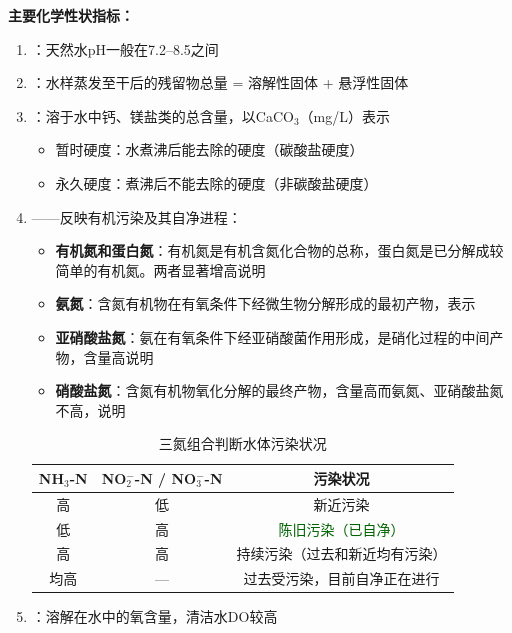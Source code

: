 \begin{keybox}
\textbf{主要化学性状指标：}

\begin{enumerate}[leftmargin=*]
    \item {}：天然水pH一般在7.2--8.5之间
    \item {}：水样蒸发至干后的残留物总量 = 溶解性固体 + 悬浮性固体
    \item {}：溶于水中钙、镁盐类的总含量，以CaCO$_3$（mg/L）表示
    \begin{itemize}
        \item 暂时硬度：水煮沸后能去除的硬度（碳酸盐硬度）
        \item 永久硬度：煮沸后不能去除的硬度（非碳酸盐硬度）
    \end{itemize}
    \item {}——反映有机污染及其自净进程：
    \begin{itemize}
        \item \textbf{有机氮和蛋白氮}：有机氮是有机含氮化合物的总称，蛋白氮是已分解成较简单的有机氮。两者显著增高说明
        \item \textbf{氨氮}：含氮有机物在有氧条件下经微生物分解形成的最初产物，表示
        \item \textbf{亚硝酸盐氮}：氨在有氧条件下经亚硝酸菌作用形成，是硝化过程的中间产物，含量高说明
        \item \textbf{硝酸盐氮}：含氮有机物氧化分解的最终产物，含量高而氨氮、亚硝酸盐氮不高，说明
    \end{itemize}
    \begin{table}[H]
    \centering
    \caption{三氮组合判断水体污染状况}
    \begin{tabular}{ccc}
    \hline
    \textbf{NH$_3$-N} & \textbf{NO$_2^-$-N / NO$_3^-$-N} & \textbf{污染状况} \\
    \hline
    高 & 低 & \textcolor{keyred}{新近污染} \\
    低 & 高 & \textcolor{darkgreen}{陈旧污染（已自净）} \\
    高 & 高 & 持续污染（过去和新近均有污染） \\
    均高 & — & 过去受污染，目前自净正在进行 \\
    \hline
    \end{tabular}
    \end{table}
    \item {}：溶解在水中的氧含量，清洁水DO较高

\end{enumerate}
\end{keybox}
